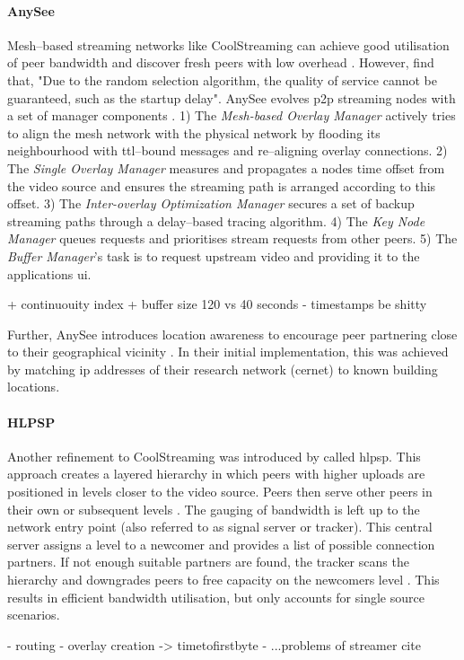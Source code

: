 \paragraph{AnySee}
Mesh–based streaming networks like CoolStreaming can achieve good utilisation of peer bandwidth and discover fresh peers with low overhead \cite[\SII]{anysee}. However, \citet[\SIII]{anysee} find that, "Due to the random selection algorithm, the quality of service cannot be guaranteed, such as the startup delay". AnySee evolves \gls{p2p} streaming nodes with a set of manager components \citep[\SIII.B-F]{anysee}. 1) The \textit{Mesh-based Overlay Manager} actively tries to align the mesh network with the physical network by flooding its neighbourhood with \gls{ttl}–bound messages and re–aligning overlay connections. 2) The \textit{Single Overlay Manager} measures and propagates a nodes time offset from the video source and ensures the streaming path is arranged according to this offset. 3) The \textit{Inter-overlay Optimization Manager} secures a set of backup streaming paths through a delay–based tracing algorithm. 4) The \textit{Key Node Manager} queues requests and prioritises stream requests from other peers. 5) The \textit{Buffer Manager}'s task is to request upstream video and providing it to the applications \gls{ui}.

+ continuouity index
+ buffer size 120 vs 40 seconds
- timestamps be shitty

Further, AnySee introduces location awareness to encourage peer partnering close to their geographical vicinity \citep[\SV.B.1]{anysee}. In their initial implementation, this was achieved by matching \gls{ip} addresses of their research network (\gls{cernet}) to known building locations.

\paragraph{HLPSP}
Another refinement to CoolStreaming was introduced by \citet*{hlpsp} called \gls{hlpsp}. This approach creates a layered hierarchy in which peers with higher uploads are positioned in levels closer to the video source. Peers then serve other peers in their own or subsequent levels \cite[\S3]{hlpsp}. The gauging of bandwidth is left up to the network entry point (also referred to as signal server or tracker). This central server assigns a level to a newcomer and provides a list of possible connection partners. If not enough suitable partners are found, the tracker scans the hierarchy and downgrades peers to free capacity on the newcomers level \cite[\S3.3.2]{hlpsp}. This results in efficient bandwidth utilisation, but only accounts for single source scenarios.

- routing
- overlay creation -> timetofirstbyte
- ...problems of streamer cite
